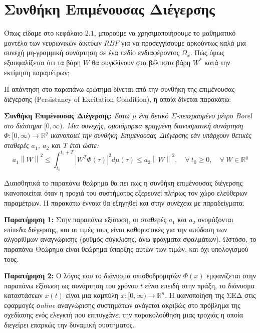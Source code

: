 \section{Συνθήκη Επιμένουσας Διέγερσης}
Όπως είδαμε στο κεφάλαιο $2.1$, μπορούμε να χρησιμοποιήσουμε το μαθηματικό μοντέλο των νευρωνικών δικτύων $RBF$ για να προσεγγίσουμε αρκούντως καλά μια συνεχή μη-γραμμική συνάρτηση σε ένα πεδίο ενδιαφέροντος $\Omega_x$. Πώς όμως εξασφαλίζεται ότι τα βάρη $W$ θα συγκλίνουν στα βέλτιστα βάρη $W^*$ κατά την εκτίμηση παραμέτρων;

Η απάντηση στο παραπάνω ερώτημα δίνεται από την συνθήκη της επιμένουσας διέγερσης (Persistancy of Excitation Condition), η οποία δίνεται παρακάτω:

\textbf{Συνθήκη Επιμένουσας Διέγερσης:} 
\textit{Έστω $\mu$ ένα θετικό $\Sigma$-πεπερασμένο μέτρο Borel στο διάστημα $[0,\infty)$. Μια συνεχής, ομοιόμορφα φραγμένη διανυσματική συνάρτηση $\varPhi: [0,\infty) \rightarrow \mathbb{R}^q$ ικανοποιεί την συνθήκη Επιμένουσας Διέγερσης εάν υπάρχουν θετικές σταθερές $a_1$, $a_2$ και $T$ έτσι ώστε:
\begin{equation}
	a_1 \left\| W \right\|^2 
	\leq
	\int_{t_0}^{t_0 + T} \left| W^T \varPhi(\tau) \right|^2 d\mu(\tau) 
	\leq
	a_2 \left\| W \right\|^2, \quad
	\forall \: t_0 \geq 0 , \quad
	\forall \: W \in \mathbb{R}^q
	\label{eq:pe_condition}
\end{equation}
}

Διαισθητικά το παραπάνω θεώρημα θα πει πως η συνθήκη επιμένουσας διέγερσης ικανοποιείται όταν η τροχιά του συστήματος εξερευνεί πλήρως τον χώρο ελεύθερων παραμέτρων. Η παρακάτω έννοια θα εξηγηθεί και στην συνέχεια με παραδείγματα.

\textbf{Παρατήρηση 1:} Στην παραπάνω εξίσωση, οι σταθερές $a_1$ και $a_2$ ονομάζονται επίπεδα διέγερσης, και οι τιμές τους είναι καθοριστικές για την απόδοση των αλγορίθμων αναγνώρισης (ρυθμός σύγκλισης, άνω φράγματα σφαλμάτων). Ωστόσο, το παραπάνω Θεώρημα είναι θεώρημα ύπαρξης αυτών των τιμών, και όχι υπολογισμού τους.

\textbf{Παρατήρηση 2:} Ο λόγος που το διάνυσμα οπισθοδρομητών $\varPhi(x)$ εμφανίζεται στην παραπάνω εξίσωση ως συνάρτηση του χρόνου $t$ είναι επειδή στην πράξη, το διάνυσμα καταστάσεων $x(t)$ είναι μια καμπύλη $x: [0,\infty) \rightarrow \mathbb{R}^n$. Η ικανοποίηση της ΣΕΔ στις εφαρμογές \textit{οnline} αναγνώρισης συστημάτων ανάγεται ακριβώς στο πρόβλημα της σχεδίασης ενός ελεγκτή που επιτυγχάνει την παρακολούθηση μιας τροχιάς η οποία διεγείρει επαρκώς την δυναμική συστήματος.

